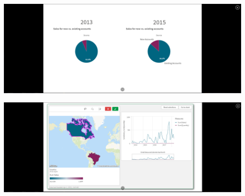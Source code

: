 \documentclass[12pt,letterpaper]{article}
\newcommand\tab[1][1cm]{\hspace*{#1}}
\begin{document}
\begin{enumerate}[\tab 1.]
        \begin{center}
            \includegraphics[width=13cm]{./img/img49.1.png}
        \end{center}
        \begin{center}
            \includegraphics[width=13cm]{./img/img49.2.png}
        \end{center}
    \end{enumerate}
    \newpage
\end{document}
